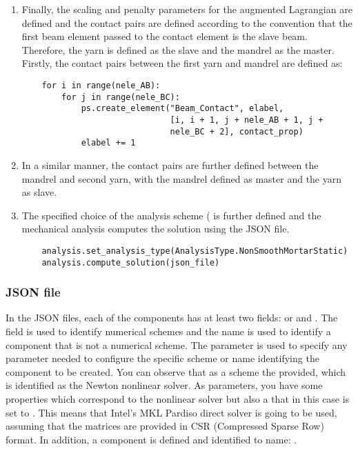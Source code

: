 \begin{enumerate}
    \item Finally, the scaling and penalty parameters for the augmented Lagrangian are defined and the contact pairs are defined according to the convention that the first beam element passed to the contact element is the slave beam. Therefore, the yarn is defined as the slave and the mandrel as the master. Firstly, the contact pairs between the first yarn  and mandrel  are defined as:
    \pythonstyle
    \begin{tcolorbox}\begin{lstlisting}
    for i in range(nele_AB):
        for j in range(nele_BC):
            ps.create_element("Beam_Contact", elabel,
                              [i, i + 1, j + nele_AB + 1, j +
                              nele_BC + 2], contact_prop)
            elabel += 1
    \end{lstlisting}\end{tcolorbox}
    \item In a similar manner, the contact pairs are further defined between the mandrel and second yarn, with the mandrel defined as master and the yarn as slave.
    \item The specified choice of the analysis scheme ( is further defined and the mechanical analysis computes the solution using the JSON file.
    \pythonstyle
    \begin{tcolorbox}\begin{lstlisting}
    analysis.set_analysis_type(AnalysisType.NonSmoothMortarStatic)
    analysis.compute_solution(json_file)
    \end{lstlisting}\end{tcolorbox}    
\end{enumerate}

\subsubsection{JSON file}
In the JSON files, each of the components has at least two fields:  or  and . The field  is used to identify numerical schemes and the name is used to identify a component that is not a numerical scheme. The  parameter is used to specify any parameter needed to configure the specific scheme or name identifying the component to be created. You can observe that as a scheme the  provided, which is identified as the Newton nonlinear solver. As parameters, you have some properties which correspond to the nonlinear solver but also a  that in this case is set to . This means that Intel's MKL Pardiso direct solver is going to be used, assuming that the matrices are provided in CSR (Compressed Sparse Row) format. In addition, a component  is defined and identified to name: .

